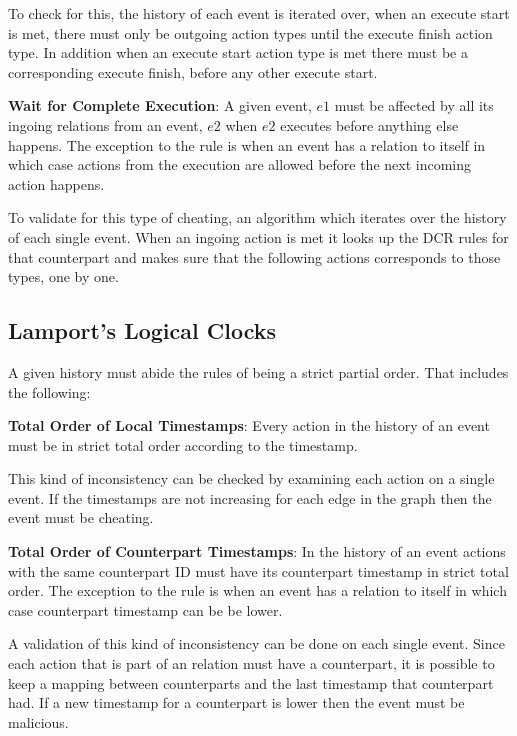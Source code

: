 	To check for this, the history of each event is iterated over, when an execute start is met, there must only be outgoing action types until the execute finish action type. In addition when an execute start action type is met there must be a corresponding execute finish, before any other execute start.
	
	\newpar \textbf{Wait for Complete Execution}: A given event, $e1$ must be affected by all its ingoing relations from an event, $e2$ when $e2$ executes before anything else happens. The exception to the rule is when an event has a relation to itself in which case actions from the execution are allowed before the next incoming action happens. 
	
	To validate for this type of cheating, an algorithm which iterates over the history of each single event. When an ingoing action is met it looks up the DCR rules for that counterpart and makes sure that the following actions corresponds to those types, one by one.
	\subsection{Lamport's Logical Clocks}
	A given history must abide the rules of being a strict partial order. That includes the following:
	
	\newpar \textbf{Total Order of Local Timestamps}: Every action in the history of an event must be in strict total order according to the timestamp.
	
	This kind of inconsistency can be checked by examining each action on a single event. If the timestamps are not increasing for each edge in the graph then the event must be cheating. 
	
	\newpar \textbf{Total Order of Counterpart Timestamps}: In the history of an event actions with the same counterpart ID must have its counterpart timestamp in strict total order.  The exception to the rule is when an event has a relation to itself in which case counterpart timestamp can be be lower.
	
	A validation of this kind of inconsistency can be done on each single event. Since each action that is part of an relation must have a counterpart, it is possible to keep a mapping between counterparts and the last timestamp that counterpart had. If a new timestamp for a counterpart is lower then the event must be malicious.
	
